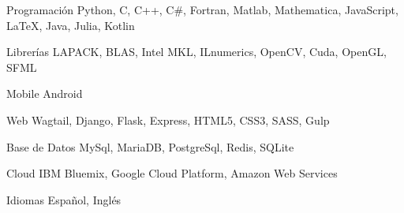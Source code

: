 
\begin{cvskills}

  \cvskill
    {Programación} %
    {Python, C, C++, C\#, Fortran, Matlab, Mathematica, JavaScript, LaTeX, Java, Julia, Kotlin} %

  \cvskill
    {Librerías} %
    {LAPACK, BLAS, Intel MKL, ILnumerics, OpenCV, Cuda, OpenGL, SFML} %

  \cvskill
    {Mobile} %
    {Android} %

  \cvskill
    {Web} %
    {Wagtail, Django, Flask, Express, HTML5, CSS3, SASS, Gulp} %

  \cvskill
    {Base de Datos} %
    {MySql, MariaDB, PostgreSql, Redis, SQLite} %

  \cvskill
    {Cloud} %
    {IBM Bluemix, Google Cloud Platform, Amazon Web Services} %

  \cvskill
    {Idiomas} %
    {Español, Inglés} %

\end{cvskills}
